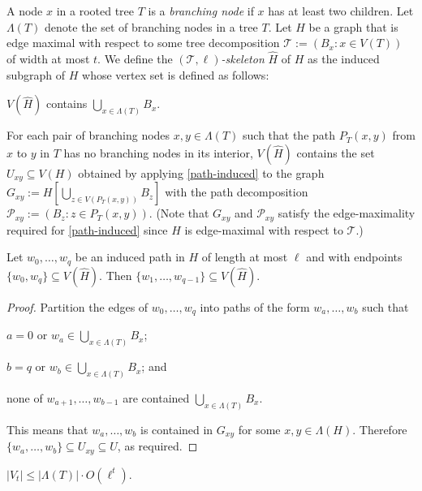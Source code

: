 \documentclass[kpfonts]{patmorin}
\theoremstyle{named}
\begin{document}
A node $x$ in a rooted tree $T$ is a \emph{branching node} if $x$ has at least two children.  Let $\Lambda(T)$ denote the set of branching nodes in a tree $T$.  Let $H$ be a graph that is edge maximal with respect to some tree decomposition $\mathcal{T}:=(B_x:x\in V(T))$ of width at most $t$. We define the \emph{$(\mathcal{T},\ell)$-skeleton} $\hat{H}$ of $H$ as the induced subgraph of $H$ whose vertex set is defined as follows:
\begin{compactenum}
    \item $V(\hat{H})$ contains $\bigcup_{x\in\Lambda(T)} B_x$.

    \item For each pair of branching nodes $x,y\in\Lambda(T)$ such that the path $P_T(x,y)$ from $x$ to $y$ in $T$ has no branching nodes in its interior, $V(\hat{H})$ contains the set $U_{xy}\subseteq V(H)$ obtained by applying \cref{path-induced} to the graph $G_{xy}:=H[\bigcup_{z\in V(P_T(x,y))} B_z]$ with the path decomposition $\mathcal{P}_{xy}:=(B_z:z\in P_T(x,y))$.  (Note that $G_{xy}$ and $\mathcal{P}_{xy}$ satisfy the edge-maximality required for \cref{path-induced} since $H$ is edge-maximal with respect to $\mathcal{T}$.)
\end{compactenum}


\begin{lem}\label{skeleton-paths}
    Let $w_0,\ldots,w_q$ be an induced path in $H$ of length at most $\ell$ and with endpoints $\{w_0,w_q\}\subseteq V(\hat{H})$. Then $\{w_1,\ldots,w_{q-1}\}\subseteq V(\hat{H})$.
\end{lem}

\begin{proof}
    Partition the edges of $w_0,\ldots,w_q$ into paths of the form $w_a,\ldots,w_b$ such that
    \begin{inparaenum}[(i)]
        \item $a=0$ or $w_a\in\bigcup_{x\in \Lambda(T)} B_x$;
        \item $b=q$ or $w_b\in\bigcup_{x\in \Lambda(T)} B_x$; and
        \item none of $w_{a+1},\ldots,w_{b-1}$ are contained $\bigcup_{x\in \Lambda(T)} B_x$.
    \end{inparaenum}
    This means that $w_a,\ldots,w_b$ is contained in $G_{xy}$ for some $x,y\in \Lambda(H)$.  Therefore $\{w_a,\ldots,w_b\}\subseteq U_{xy}\subseteq U$, as required.
\end{proof}


\begin{lem}\label{skeleton-size}
    $|V_t|\le |\Lambda(T)|\cdot O(\ell^t)$.
\end{lem}
\end{document}
